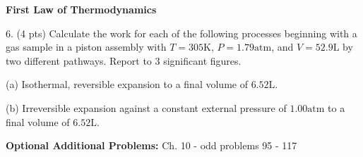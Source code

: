 \documentclass[11pt]{article}
\begin{document}
%

\pagebreak

\textbf{First Law of Thermodynamics}

6. (4 pts) Calculate the work for each of the following processes beginning with a gas
sample in a piston assembly with $T=305\text{K}$, $P=1.79\text{atm}$, and
$V=52.9\text{L}$ by two different pathways. Report to 3 significant figures.

(a) Isothermal, reversible expansion to a final volume of $6.52\text{L}$.

(b) Irreversible expansion against a constant external pressure of $1.00\text{atm}$
to a final volume of $6.52\text{L}$.

\vfill
\textbf{Optional Additional Problems:} Ch. 10 - odd problems 95 - 117
\end{document}
